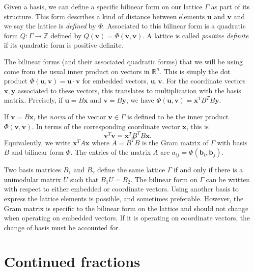 \documentclass[11pt]{report}
\theoremstyle{definition}
\begin{document}
Given a basis, we can define a specific bilinear form on our lattice $\Gamma$ as part of its structure. This form describes a kind of distance between elements $\mathbf{u}$ and $\mathbf{v}$ and we say the lattice is \textit{defined} by $\Phi$. Associated to this bilinear form is a quadratic form $Q: \Gamma \to \mathbb{Z}$ defined by $Q(\mathbf{v}) = \Phi(\mathbf{v}, \mathbf{v})$. A lattice is called \textit{positive definite} if its quadratic form is positive definite.

The bilinear forms (and their associated quadratic forms) that we will be using come from the usual inner product on vectors in $\mathbb{R}^n$. This is simply the dot product $\Phi(\mathbf{u},\mathbf{v}) = \mathbf{u} \cdot \mathbf{v}$ for embedded vectors, $\mathbf{u},\mathbf{v}$. For the coordinate vectors $\mathbf{x},\mathbf{y}$ associated to these vectors, this translates to multiplication with the basis matrix. Precisely, if $\mathbf{u} = B\mathbf{x}$ and $\mathbf{v} = B\mathbf{y}$, we have $\Phi(\mathbf{u},\mathbf{v}) = \mathbf{x}^TB^TB\mathbf{y}$.

If $\mathbf{v} = B\mathbf{x}$, the \textit{norm} of the vector $\mathbf{v} \in \Gamma$ is defined to be the inner product $\Phi(\mathbf{v},\mathbf{v})$. In terms of the corresponding coordinate vector $\mathbf{x}$, this is
\[\mathbf{v}^T\mathbf{v} = \mathbf{x}^TB^TB\mathbf{x}.\]
Equivalently, we write $\mathbf{x}^TA\mathbf{x}$ where $A = B^TB$ is the Gram matrix of $\Gamma$ with basis $B$ and bilinear form $\Phi$. The entries of the matrix $A$ are $a_{ij} = \Phi(\mathbf{b}_i,\mathbf{b}_j)$.

Two basis matrices $B_1$ and $B_2$ define the same lattice $\Gamma$ if and only if there is a unimodular matrix $U$ such that $B_1U = B_2$. The bilinear form on $\Gamma$ can be written with respect to either embedded or coordinate vectors. Using another basis to express the lattice elements is possible, and sometimes preferable. However, the Gram matrix is specific to the bilinear form on the lattice and should not change when operating on embedded vectors. If it is operating on coordinate vectors, the change of basis must be accounted for.


\section{Continued fractions}
\label{sec:continued-fractions}
\end{document}
